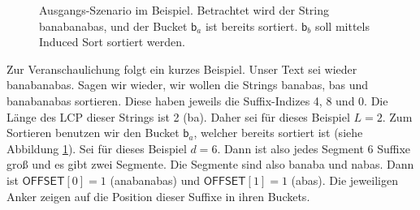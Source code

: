 \begin{figure}
\centering
{}
\caption{Ausgangs-Szenario im Beispiel. Betrachtet wird der String \glqq banabanabas\grqq, und der Bucket $\mathsf{b}_a$ ist bereits sortiert. $\mathsf{b}_b$ soll mittels Induced Sort sortiert werden.}
\label{fg:beispiel}
\end{figure}

Zur Veranschaulichung folgt ein kurzes Beispiel. Unser Text sei wieder \glqq banabanabas\grqq.
Sagen wir wieder, wir wollen die Strings \glqq banabas\grqq, \glqq bas\grqq{} und \glqq banabanabas\grqq{} sortieren.
Diese haben jeweils die Suffix-Indizes 4, 8 und 0.
Die Länge des LCP dieser Strings ist 2 (\glqq ba\grqq).
Daher sei für dieses Beispiel $L = 2$.
Zum Sortieren benutzen wir den Bucket $\mathsf{b}_a$, welcher bereits sortiert ist (siehe Abbildung \ref{fg:beispiel}).
Sei für dieses Beispiel $d = 6$.
Dann ist also jedes Segment 6 Suffixe groß und es gibt zwei Segmente.
Die Segmente sind also \glqq banaba\grqq{} und \glqq nabas\grqq.
Dann ist $\mathsf{OFFSET}[0] = 1$ (\glqq anabanabas\grqq) und $\mathsf{OFFSET}[1] = 1$ (\glqq abas\grqq).
Die jeweiligen Anker zeigen auf die Position dieser Suffixe in ihren Buckets.

